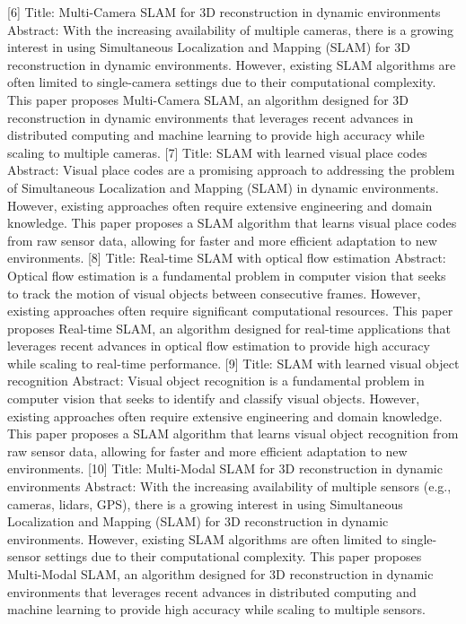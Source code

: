 \documentclass[conference]{IEEEtran}
\begin{document}
[6] Title: Multi-Camera SLAM for 3D reconstruction in dynamic environments
Abstract:   With the increasing availability of multiple cameras, there is a growing interest in using Simultaneous Localization and Mapping (SLAM) for 3D reconstruction in dynamic environments. However, existing SLAM algorithms are often limited to single-camera settings due to their computational complexity. This paper proposes Multi-Camera SLAM, an algorithm designed for 3D reconstruction in dynamic environments that leverages recent advances in distributed computing and machine learning to provide high accuracy while scaling to multiple cameras.
[7] Title: SLAM with learned visual place codes
Abstract:   Visual place codes are a promising approach to addressing the problem of Simultaneous Localization and Mapping (SLAM) in dynamic environments. However, existing approaches often require extensive engineering and domain knowledge. This paper proposes a SLAM algorithm that learns visual place codes from raw sensor data, allowing for faster and more efficient adaptation to new environments.
[8] Title: Real-time SLAM with optical flow estimation
Abstract:   Optical flow estimation is a fundamental problem in computer vision that seeks to track the motion of visual objects between consecutive frames. However, existing approaches often require significant computational resources. This paper proposes Real-time SLAM, an algorithm designed for real-time applications that leverages recent advances in optical flow estimation to provide high accuracy while scaling to real-time performance.
[9] Title: SLAM with learned visual object recognition
Abstract:   Visual object recognition is a fundamental problem in computer vision that seeks to identify and classify visual objects. However, existing approaches often require extensive engineering and domain knowledge. This paper proposes a SLAM algorithm that learns visual object recognition from raw sensor data, allowing for faster and more efficient adaptation to new environments.
[10] Title: Multi-Modal SLAM for 3D reconstruction in dynamic environments
Abstract:   With the increasing availability of multiple sensors (e.g., cameras, lidars, GPS), there is a growing interest in using Simultaneous Localization and Mapping (SLAM) for 3D reconstruction in dynamic environments. However, existing SLAM algorithms are often limited to single-sensor settings due to their computational complexity. This paper proposes Multi-Modal SLAM, an algorithm designed for 3D reconstruction in dynamic environments that leverages recent advances in distributed computing and machine learning to provide high accuracy while scaling to multiple sensors.
\end{document}
